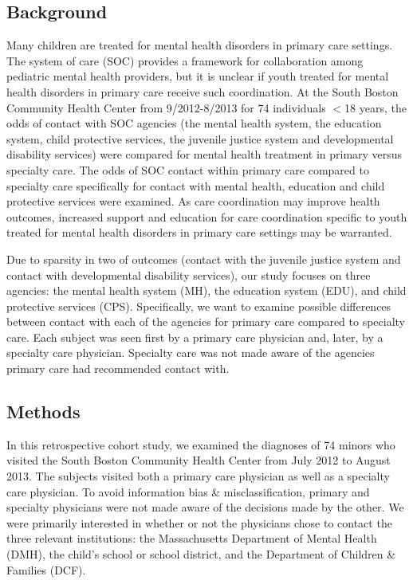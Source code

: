 \documentclass{article}
\begin{document}
	\subsection*{Background}
	Many children are treated for mental health disorders in primary care settings.  The system of care (SOC) provides a framework for collaboration among pediatric mental health providers, but it is unclear if youth treated for mental health disorders in primary care receive such coordination.  At the South Boston Community Health Center from 9/2012-8/2013 for 74 individuals $<$18 years, the odds of contact with SOC agencies (the mental health system, the education system, child protective services, the juvenile justice system and developmental disability services) were compared for mental health treatment in primary versus specialty care.  The odds of SOC contact within primary care compared to specialty care specifically for contact with mental health, education and child protective services were examined.  As care coordination may improve health outcomes, increased support and education for care coordination specific to youth treated for mental health disorders in primary care settings may be warranted.
	
	Due to sparsity in two of outcomes (contact with the juvenile justice system and contact with developmental disability services), our study focuses on three agencies: the mental health system (MH), the education system (EDU), and child protective services (CPS). Specifically, we want to examine possible differences between contact with each of the agencies for primary care compared to specialty care. Each subject was seen first by a primary care physician and, later, by a specialty care physician. Specialty care was not made aware of the agencies primary care had recommended contact with. 

	\subsection*{Methods}
	In this retrospective cohort study, we examined the diagnoses of 74 minors who visited the South Boston Community Health Center from July 2012 to August 2013. The subjects visited both a primary care physician as well as a specialty care physician. To avoid information bias \& misclassification, primary and specialty physicians were not made aware of the decisions made by the other. We were primarily interested in whether or not the physicians chose to contact the three relevant institutions: the Massachusetts Department of Mental Health (DMH), the child’s school or school district, and the Department of Children \& Families (DCF).
\end{document}
